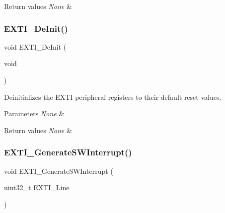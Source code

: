 \begin{DoxyRetVals}{Return values}
{\em None} & \\
\hline
\end{DoxyRetVals}
\mbox{\label{group___e_x_t_i___private___functions_ga07072e339cb9ecb9cd9d4b94afc9f317}} 
\subsubsection{\texorpdfstring{EXTI\_DeInit()}{EXTI\_DeInit()}}
{\footnotesize\ttfamily void E\+X\+T\+I\+\_\+\+De\+Init (\begin{DoxyParamCaption}\item[{void}]{ }\end{DoxyParamCaption})}



Deinitializes the E\+X\+TI peripheral registers to their default reset values. 


\begin{DoxyParams}{Parameters}
{\em None} & \\
\hline
\end{DoxyParams}

\begin{DoxyRetVals}{Return values}
{\em None} & \\
\hline
\end{DoxyRetVals}
\mbox{\label{group___e_x_t_i___private___functions_ga897e8ea59f40a19e047fb9994876fc9b}} 
\subsubsection{\texorpdfstring{EXTI\_GenerateSWInterrupt()}{EXTI\_GenerateSWInterrupt()}}
{\footnotesize\ttfamily void E\+X\+T\+I\+\_\+\+Generate\+S\+W\+Interrupt (\begin{DoxyParamCaption}\item[{uint32\+\_\+t}]{E\+X\+T\+I\+\_\+\+Line }\end{DoxyParamCaption})}



